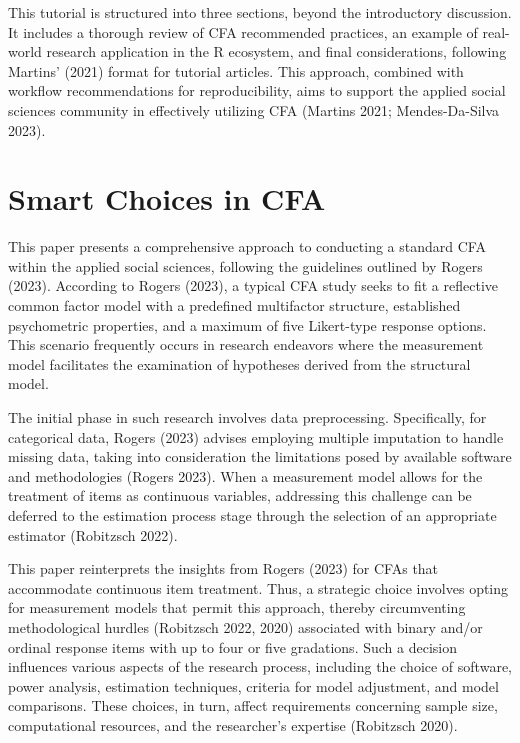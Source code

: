 \documentclass[
  a4paper,
]{article}
\begin{document}
This tutorial is structured into three sections, beyond the introductory
discussion. It includes a thorough review of CFA recommended practices,
an example of real-world research application in the R ecosystem, and
final considerations, following Martins' (2021) format for tutorial
articles. This approach, combined with workflow recommendations for
reproducibility, aims to support the applied social sciences community
in effectively utilizing CFA (Martins 2021; Mendes-Da-Silva 2023).


\section{Smart Choices in CFA}\label{smart-choices-in-cfa}

This paper presents a comprehensive approach to conducting a standard
CFA within the applied social sciences, following the guidelines
outlined by Rogers (2023). According to Rogers (2023), a typical CFA
study seeks to fit a reflective common factor model with a predefined
multifactor structure, established psychometric properties, and a
maximum of five Likert-type response options. This scenario frequently
occurs in research endeavors where the measurement model facilitates the
examination of hypotheses derived from the structural model.

The initial phase in such research involves data preprocessing.
Specifically, for categorical data, Rogers (2023) advises employing
multiple imputation to handle missing data, taking into consideration
the limitations posed by available software and methodologies (Rogers
2023). When a measurement model allows for the treatment of items as
continuous variables, addressing this challenge can be deferred to the
estimation process stage through the selection of an appropriate
estimator (Robitzsch 2022).

This paper reinterprets the insights from Rogers (2023) for CFAs that
accommodate continuous item treatment. Thus, a strategic choice involves
opting for measurement models that permit this approach, thereby
circumventing methodological hurdles (Robitzsch 2022, 2020) associated
with binary and/or ordinal response items with up to four or five
gradations. Such a decision influences various aspects of the research
process, including the choice of software, power analysis, estimation
techniques, criteria for model adjustment, and model comparisons. These
choices, in turn, affect requirements concerning sample size,
computational resources, and the researcher's expertise (Robitzsch
2020).
\end{document}
